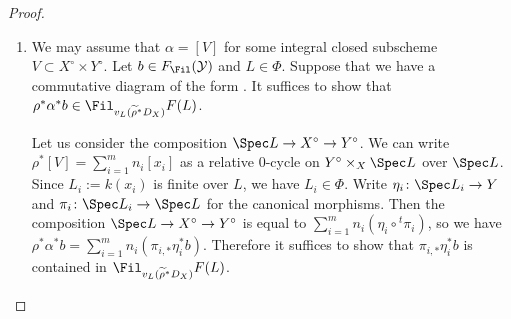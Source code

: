 \documentclass{amsart}
\theoremstyle{plain}
\theoremstyle{definition}
\theoremstyle{remark}
\numberwithin{equation}{section}
\begin{document}
\begin{proof}
    \begin{enumerate}
        \item We may assume that $\alpha = [V]$ for some integral closed subscheme $V\subset X^\circ\times Y^\circ$.
        Let $b\in F_{\Fil}(\mathcal{Y})$ and $L\in \Phi$.
        Suppose that we have a commutative diagram of the form .
        It suffices to show that $\rho^*\alpha^*b\in \Fil_{v_L(\widetilde{\rho}^*D_X)}F(L)$.

        Let us consider the composition $\Spec L\to X^\circ\to Y^\circ$.
        We can write $\rho^*[V]=\sum_{i=1}^m n_i[x_i]$ as a relative $0$-cycle on $Y^\circ\times_X\Spec L$ over $\Spec L$.
        Since $L_i:=k(x_i)$ is finite over $L$, we have $L_i\in \Phi$.
        Write $\eta_i\colon \Spec L_i\to Y$ and $\pi_i\colon \Spec L_i\to \Spec L$ for the canonical morphisms.
        Then the composition $\Spec L\to X^\circ\to Y^\circ$ is equal to $\sum_{i=1}^m n_i(\eta_i\circ {}^t\pi_i)$, so we have $\rho^*\alpha^*b=\sum_{i=1}^mn_i(\pi_{i,*}\eta_i^*b)$.
        Therefore it suffices to show that $\pi_{i,*}\eta_i^*b$ is contained in $\Fil_{v_L(\widetilde{\rho}^*D_X)}F(L)$.


\end{enumerate}
\end{proof}
\end{document}
